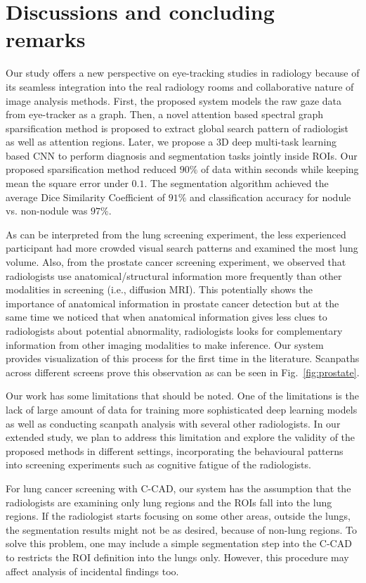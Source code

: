\documentclass[preprint,12pt]{elsarticle}
\begin{document}
\section{Discussions and concluding remarks}
Our study offers a new perspective on eye-tracking studies in radiology because of its seamless integration into the real radiology rooms and collaborative nature of image analysis methods. First, the proposed system models the raw gaze data from eye-tracker as a graph. Then, a novel attention based spectral graph sparsification method is proposed to extract global search pattern of radiologist as well as attention regions. Later, we propose a 3D deep multi-task learning based CNN to perform diagnosis and segmentation tasks jointly inside ROIs. Our proposed sparsification method reduced $90\%$ of data within seconds while keeping mean the square error under $0.1$. The segmentation algorithm achieved the average Dice Similarity Coefficient of $91\%$ and classification accuracy for nodule vs. non-nodule was $97\%$.

As can be interpreted from the lung screening experiment, the less experienced participant had more crowded visual search patterns and examined the most lung volume. Also, from the prostate cancer screening experiment, we observed that radiologists use anatomical/structural information more frequently than other modalities in screening (i.e., diffusion MRI). This potentially shows the importance of anatomical information in prostate cancer detection but at the same time we noticed that when anatomical information gives less clues to radiologists about potential abnormality, radiologists looks for complementary information from other imaging modalities to make inference. Our system provides visualization of this process for the first time in the literature. Scanpaths across different screens prove this observation as can be seen in Fig.~\ref{fig:prostate}. 

Our work has some limitations that should be noted. One of the limitations  is the lack of large amount of data for training more sophisticated deep learning models as well as conducting scanpath analysis with several other radiologists. In our extended study, we plan to address this limitation and explore the validity of the proposed methods in different settings, incorporating the behavioural patterns into screening experiments such as cognitive fatigue of the radiologists.

For lung cancer screening with C-CAD, our system has the assumption that the radiologists are examining only lung regions and the ROIs fall into the lung regions. If the radiologist starts focusing on some other areas, outside the lungs, the segmentation results might not be as desired, because of non-lung regions. To solve this problem, one may include a simple segmentation step into the C-CAD to restricts the ROI definition into the lungs only. However, this procedure may affect analysis of incidental findings too.  
\end{document}
